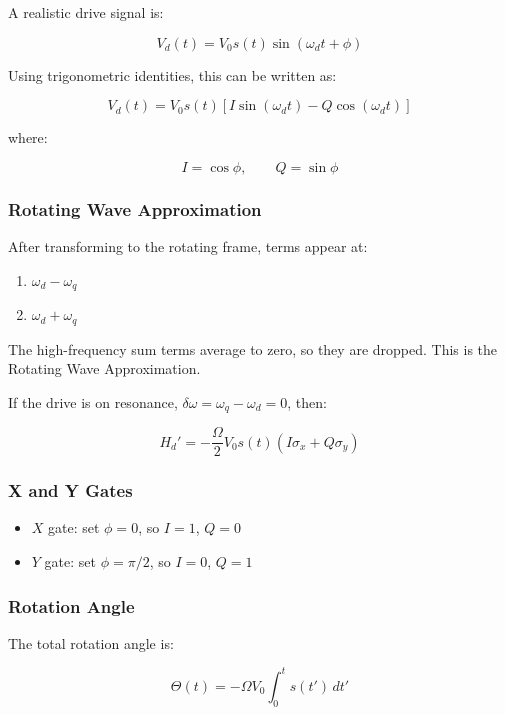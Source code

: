 \documentclass[
]{article}
\providecommand{\tightlist}{%
  \setlength{\itemsep}{0pt}\setlength{\parskip}{0pt}}
\begin{document}
A realistic drive signal is:

\[
V_d(t) = V_0 s(t)\sin(\omega_d t + \phi)
\]

Using trigonometric identities, this can be written as:

\[
V_d(t) = V_0 s(t)\left[I\sin(\omega_d t) - Q\cos(\omega_d t)\right]
\]

where:

\[
I = \cos\phi, \qquad Q = \sin\phi
\]

\subsubsection{Rotating Wave
Approximation}\label{rotating-wave-approximation}

After transforming to the rotating frame, terms appear at:

\begin{enumerate}
\def\labelenumi{\arabic{enumi}.}
\tightlist
\item
  \(\omega_d - \omega_q\)
\item
  \(\omega_d + \omega_q\)
\end{enumerate}

The high-frequency sum terms average to zero, so they are dropped. This
is the Rotating Wave Approximation.

If the drive is on resonance,
\(\delta\omega = \omega_q - \omega_d = 0\), then:

\[
H_d' = -\frac{\Omega}{2}V_0 s(t)\left(I\sigma_x + Q\sigma_y\right)
\]

\subsubsection{X and Y Gates}\label{x-and-y-gates}

\begin{itemize}
\tightlist
\item
  \(X\) gate: set \(\phi = 0\), so \(I=1\), \(Q=0\)
\item
  \(Y\) gate: set \(\phi = \pi/2\), so \(I=0\), \(Q=1\)
\end{itemize}

\subsubsection{Rotation Angle}\label{rotation-angle}

The total rotation angle is:

\[
\Theta(t) = -\Omega V_0 \int_0^t s(t')\,dt'
\]
\end{document}
